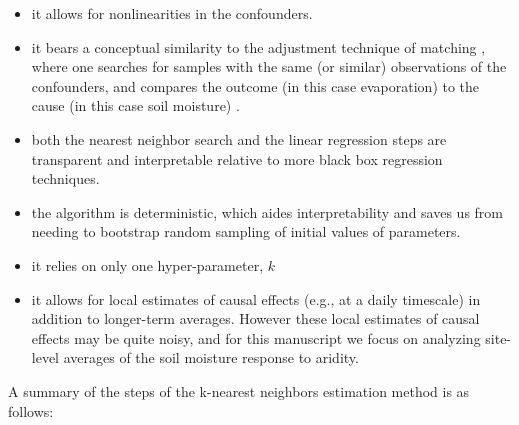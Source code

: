 \documentclass[12pt]{article}
\begin{document}
\begin{itemize}

\item it allows for nonlinearities in the confounders.
\item it bears a conceptual similarity to the adjustment technique of
  matching \cite{stuart2010matching}, where one searches for samples
  with the same (or similar) observations of the confounders, and
  compares the outcome (in this case evaporation) to the cause (in
  this case soil moisture) \cite{shalizi2013}.
\item both the nearest neighbor search and the linear regression steps
  are transparent and interpretable relative to more black box
  regression techniques.
\item the algorithm is deterministic, which aides interpretability and
  saves us from needing to bootstrap random sampling of initial values
  of parameters.
\item it relies on only one hyper-parameter, $k$
\item it allows for local estimates of causal effects (e.g., at a
  daily timescale) in addition to longer-term averages. However these
  local estimates of causal effects may be quite noisy, and for this
  manuscript we focus on analyzing site-level averages of the soil
  moisture response to aridity.
\end{itemize}


A summary of the steps of the k-nearest neighbors estimation method is
as follows:
\end{document}
